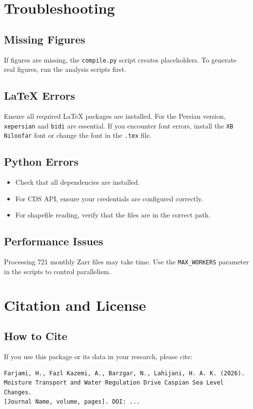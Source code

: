 \documentclass[12pt,a4paper]{article}
\begin{document}
\section{Troubleshooting}

\subsection{Missing Figures}
If figures are missing, the \texttt{compile.py} script creates placeholders. To generate real figures, run the analysis scripts first.

\subsection{LaTeX Errors}
Ensure all required LaTeX packages are installed. For the Persian version, \texttt{xepersian} and \texttt{bidi} are essential. If you encounter font errors, install the \texttt{XB Niloofar} font or change the font in the \texttt{.tex} file.

\subsection{Python Errors}
\begin{itemize}
    \item Check that all dependencies are installed.
    \item For CDS API, ensure your credentials are configured correctly.
    \item For shapefile reading, verify that the files are in the correct path.
\end{itemize}

\subsection{Performance Issues}
Processing 721 monthly Zarr files may take time. Use the \texttt{MAX\_WORKERS} parameter in the scripts to control parallelism.

\section{Citation and License}

\subsection{How to Cite}
If you use this package or its data in your research, please cite:
\begin{verbatim}
Farjami, H., Fazl Kazemi, A., Barzgar, N., Lahijani, H. A. K. (2026).
Moisture Transport and Water Regulation Drive Caspian Sea Level Changes.
[Journal Name, volume, pages]. DOI: ...
\end{verbatim}
\end{document}
